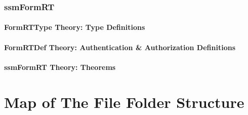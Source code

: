 \documentclass[hidelinks,12pt,a4paper]{report}
\begin{document}
\begin{appendices}
\subsection{ssmFormRT}
\subsubsection{FormRTType Theory: Type Definitions}
\subsubsection{FormRTDef Theory: Authentication \& Authorization Definitions}
\subsubsection{ssmFormRT Theory: Theorems}

\chapter{Map of The File Folder Structure}\label{foldermap}

\end{appendices}\cleardoublepage



\doublespacing
\end{document}
